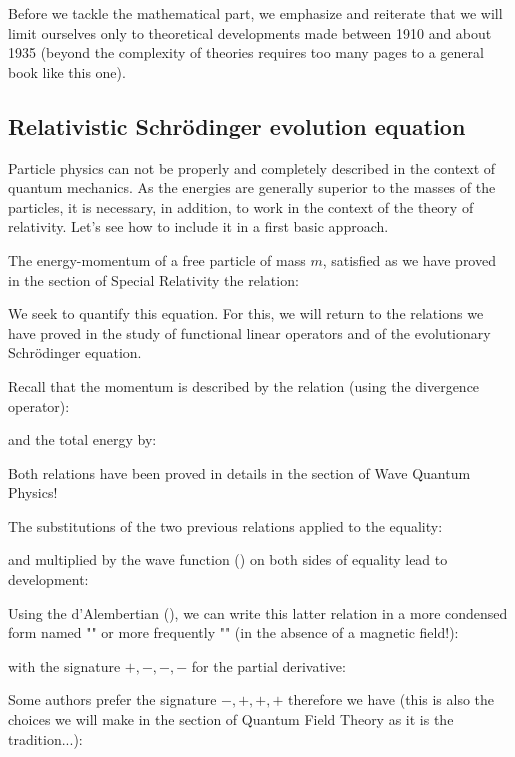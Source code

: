   	Before we tackle the mathematical part, we emphasize and reiterate that we will limit ourselves only to theoretical developments made between 1910 and about 1935 (beyond the complexity of theories requires too many pages to a general book like this one).
   
   	
   	\pagebreak
	\subsection{Relativistic Schrödinger evolution equation}
	Particle physics can not be properly and completely described in the context of quantum mechanics. As the energies are generally superior to the masses of the particles, it is necessary, in addition, to work in the context of the theory of relativity. Let's see how to include it in a first basic approach.
	
	The energy-momentum of a free particle of mass $m$, satisfied as we have proved in the section of Special Relativity the relation:
	
	We seek to quantify this equation. For this, we will return to the relations we have proved in the study of functional linear operators and of the evolutionary Schrödinger equation.
	
	Recall that the momentum is described by the relation (using the divergence operator):
	
	and the total energy by:
	
	Both relations have been proved in details in the section of Wave Quantum Physics!
	
	The substitutions of the two previous relations applied to the equality:
	
	and multiplied by the wave function () on both sides of equality lead to development:
	
	Using the d'Alembertian (), we can write this latter relation in a more condensed form named "" or more frequently "" (in the absence of a magnetic field!):
	
	with the signature $+, -, -, -$ for the partial derivative:
	
	Some authors prefer the signature  $-, +, +, +$ therefore we have (this is also the choices we will make in the section of Quantum Field Theory as it is the tradition...):
	
